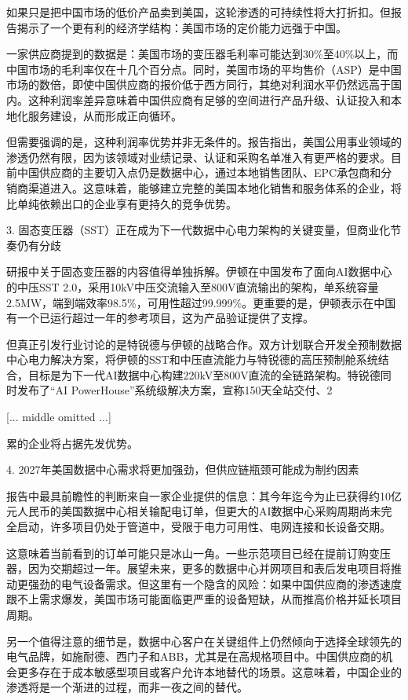 \documentclass[11pt]{ctexart}
\begin{document}
如果只是把中国市场的低价产品卖到美国，这轮渗透的可持续性将大打折扣。但报告揭示了一个更有利的经济学结构：美国市场的定价能力远强于中国。

一家供应商提到的数据是：美国市场的变压器毛利率可能达到30\%至40\%以上，而中国市场的毛利率仅在十几个百分点。同时，美国市场的平均售价（ASP）是中国市场的数倍，即使中国供应商的报价低于西方同行，其绝对利润水平仍然远高于国内。这种利润率差异意味着中国供应商有足够的空间进行产品升级、认证投入和本地化服务建设，从而形成正向循环。

但需要强调的是，这种利润率优势并非无条件的。报告指出，美国公用事业领域的渗透仍然有限，因为该领域对业绩记录、认证和采购名单准入有更严格的要求。目前中国供应商的主要切入点仍是数据中心，通过本地销售团队、EPC承包商和分销商渠道进入。这意味着，能够建立完整的美国本地化销售和服务体系的企业，将比单纯依赖出口的企业享有更持久的竞争优势。

3. 固态变压器（SST）正在成为下一代数据中心电力架构的关键变量，但商业化节奏仍有分歧

研报中关于固态变压器的内容值得单独拆解。伊顿在中国发布了面向AI数据中心的中压SST 2.0，采用10kV中压交流输入至800V直流输出的架构，单系统容量2.5MW，端到端效率98.5\%，可用性超过99.999\%。更重要的是，伊顿表示在中国有一个已运行超过一年的参考项目，这为产品验证提供了支撑。

但真正引发行业讨论的是特锐德与伊顿的战略合作。双方计划联合开发全预制数据中心电力解决方案，将伊顿的SST和中压直流能力与特锐德的高压预制舱系统结合，目标是为下一代AI数据中心构建220kV至800V直流的全链路架构。特锐德同时发布了“AI PowerHouse”系统级解决方案，宣称150天全站交付、2

[... middle omitted ...]

累的企业将占据先发优势。

4. 2027年美国数据中心需求将更加强劲，但供应链瓶颈可能成为制约因素

报告中最具前瞻性的判断来自一家企业提供的信息：其今年迄今为止已获得约10亿元人民币的美国数据中心相关输配电订单，但更大的AI数据中心采购周期尚未完全启动，许多项目仍处于管道中，受限于电力可用性、电网连接和长设备交期。

这意味着当前看到的订单可能只是冰山一角。一些示范项目已经在提前订购变压器，因为交期超过一年。展望未来，更多的数据中心并网项目和表后发电项目将推动更强劲的电气设备需求。但这里有一个隐含的风险：如果中国供应商的渗透速度跟不上需求爆发，美国市场可能面临更严重的设备短缺，从而推高价格并延长项目周期。

另一个值得注意的细节是，数据中心客户在关键组件上仍然倾向于选择全球领先的电气品牌，如施耐德、西门子和ABB，尤其是在高规格项目中。中国供应商的机会更多存在于成本敏感型项目或客户允许本地替代的场景。这意味着，中国企业的渗透将是一个渐进的过程，而非一夜之间的替代。
\end{document}
